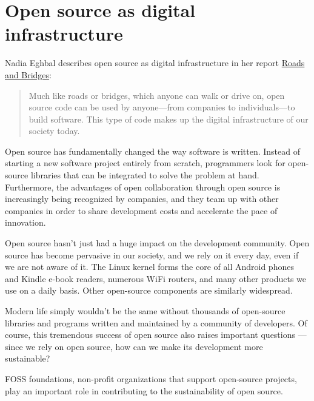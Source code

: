 


\chapter{Open source as digital infrastructure}

Nadia Eghbal describes open source as digital infrastructure in her report \href{https://www.fordfoundation.org/work/learning/research-reports/roads-and-bridges-the-unseen-labor-behind-our-digital-infrastructure/}{Roads and Bridges}:

\begin{quote}

Much like roads or bridges, which anyone can walk or drive on, open source code can be used by anyone—from companies to individuals—to build software. This type of code makes up the digital infrastructure of our society today.

\end{quote}

Open source has fundamentally changed the way software is written.  Instead of starting a new software project entirely from scratch, programmers look for open-source libraries that can be integrated to solve the problem at hand.  Furthermore, the advantages of open collaboration through open source is increasingly being recognized by companies, and they team up with other companies in order to share development costs and accelerate the pace of innovation.

Open source hasn't just had a huge impact on the development community.  Open source has become pervasive in our society, and we rely on it every day, even if we are not aware of it.  The Linux kernel forms the core of all Android phones and Kindle e-book readers, numerous WiFi routers, and many other products we use on a daily basis.  Other open-source components are similarly widespread.

Modern life simply wouldn't be the same without thousands of open-source libraries and programs written and maintained by a community of developers.  Of course, this tremendous success of open source also raises important questions --- since we rely on open source, how can we make its development more sustainable?

FOSS foundations, non-profit organizations that support open-source projects, play an important role in contributing to the sustainability of open source.

